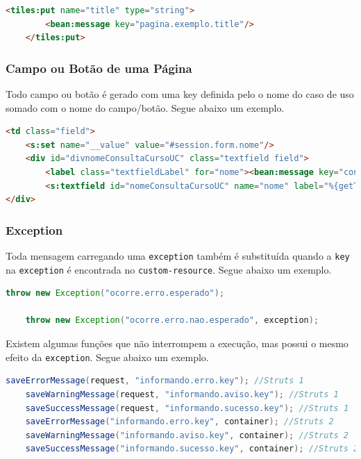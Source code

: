 \begin{lstlisting}[language=html, frame=single, breaklines=true]
	<tiles:put name="title" type="string">
    	<bean:message key="pagina.exemplo.title"/>
	</tiles:put>
\end{lstlisting}

\subsubsection{Campo ou Botão de uma Página}

Todo campo ou botão é gerado com uma key definida pelo o nome do caso de uso
somado com o nome do campo/botão. Segue abaixo um exemplo.

\begin{lstlisting}[language=html, frame=single, breaklines=true]
	<td class="field">
	<s:set name="__value" value="#session.form.nome"/>
	<div id="divnomeConsultaCursoUC" class="textfield field">
    	<label class="textfieldLabel" for="nome"><bean:message key="consulta.curso.uc.preencha.campos.consulta.curso.param.nome"/></label>
    	<s:textfield id="nomeConsultaCursoUC" name="nome" label="%{getText('consulta.curso.uc.preencha.campos.consulta.curso.param.nome')}" value="%{#session.form.nome}" title="" styleId="consultaCursoNome" />
</div>
\end{lstlisting}

\subsubsection{Exception}

Toda mensagem carregando uma \texttt{exception} também é substituída quando a
\texttt{key} na \texttt{exception} é encontrada no \texttt{custom-resource}.
Segue abaixo um exemplo.

\begin{lstlisting}[language=java, frame=single, breaklines=true]
	throw new Exception("ocorre.erro.esperado");

	throw new Exception("ocorre.erro.nao.esperado", exception);
\end{lstlisting}

Existem algumas funções que não interrompem a execução, mas possui o mesmo
efeito da \texttt{exception}. Segue abaixo um exemplo.

\begin{lstlisting}[language=java, frame=single, breaklines=true]
	saveErrorMessage(request, "informando.erro.key"); //Struts 1
	saveWarningMessage(request, "informando.aviso.key"); //Struts 1
	saveSuccessMessage(request, "informando.sucesso.key"); //Struts 1
	saveErrorMessage("informando.erro.key", container); //Struts 2
	saveWarningMessage("informando.aviso.key", container); //Struts 2
	saveSuccessMessage("informando.sucesso.key", container); //Struts 2
\end{lstlisting}

